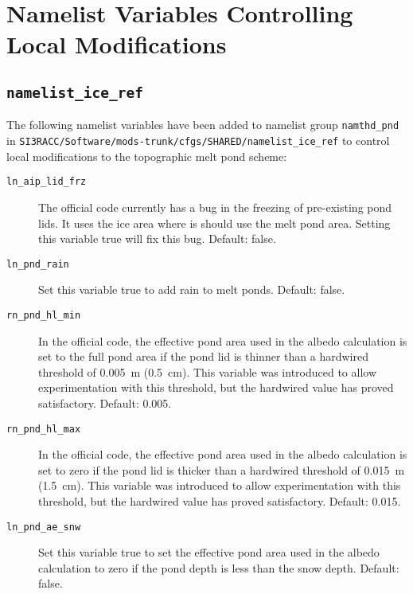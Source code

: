 \section{Namelist Variables Controlling Local Modifications}
\label{sec:topo-nml}

\subsection{\texorpdfstring{\texttt{namelist\_ice\_ref}}{namelist ice ref}}
\label{sec:topo-nml:subsec:ice-ref}

The following namelist variables have been added to namelist group \verb|namthd_pnd| in \verb|SI3RACC/Software/mods-trunk/cfgs/SHARED/namelist_ice_ref| to control local modifications to the topographic melt pond scheme:

\begin{description}

    \item[\texttt{ln\_aip\_lid\_frz}]
        The official code currently has a bug in the freezing of pre-existing pond lids.
        It uses the ice area where is should use the melt pond area.
        Setting this variable true will fix this bug.
        Default: false.

    \item[\texttt{ln\_pnd\_rain}]
        Set this variable true to add rain to melt ponds.
        Default: false.

    \item[\texttt{rn\_pnd\_hl\_min}]
        In the official code, the effective pond area used in the albedo calculation is set to the full pond area if the pond lid is thinner than a hardwired threshold of 0.005~m (0.5~cm).
        This variable was introduced to allow experimentation with this threshold, but the hardwired value has proved satisfactory.
        Default: 0.005.

    \item[\texttt{rn\_pnd\_hl\_max}]
        In the official code, the effective pond area used in the albedo calculation is set to zero if the pond lid is thicker than a hardwired threshold of 0.015~m (1.5~cm).
        This variable was introduced to allow experimentation with this threshold, but the hardwired value has proved satisfactory.
        Default: 0.015.

    \item[\texttt{ln\_pnd\_ae\_snw}]
        Set this variable true to set the effective pond area used in the albedo calculation to zero if the pond depth is less than the snow depth.
        Default: false.

\end{description}



